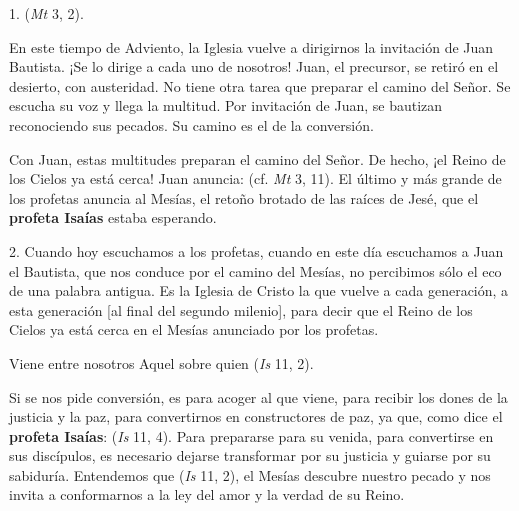 				
				\begin{body}
					1.  (\emph{Mt} 3, 2). 
					
					En este tiempo de Adviento, la Iglesia vuelve a dirigirnos la invitación de Juan Bautista. ¡Se lo dirige a cada uno de nosotros! Juan, el precursor, se retiró en el desierto, con austeridad. No tiene otra tarea que preparar el camino del Señor. Se escucha su voz y llega la multitud. Por invitación de Juan, se bautizan reconociendo sus pecados. Su camino es el de la conversión. 
					
					Con Juan, estas multitudes preparan el camino del Señor. De hecho, ¡el Reino de los Cielos ya está cerca! Juan anuncia:  (cf. \emph{Mt} 3, 11). El último y más grande de los profetas anuncia al Mesías, el retoño brotado de las raíces de Jesé, que el \textbf{profeta Isaías} estaba esperando. 
					
					2. Cuando hoy escuchamos a los profetas, cuando en este día escuchamos a Juan el Bautista, que nos conduce por el camino del Mesías, no percibimos sólo el eco de una palabra antigua. Es la Iglesia de Cristo la que vuelve a cada generación, a esta generación {[}al final del segundo milenio{]}, para decir que el Reino de los Cielos ya está cerca en el Mesías anunciado por los profetas. 
					
					Viene entre nosotros Aquel sobre quien  (\emph{Is} 11, 2). 
					
					Si se nos pide conversión, es para acoger al que viene, para recibir los dones de la justicia y la paz, para convertirnos en constructores de paz, ya que, como dice el \textbf{profeta Isaías}:  (\emph{Is} 11, 4). Para prepararse para su venida, para convertirse en sus discípulos, es necesario dejarse transformar por su justicia y guiarse por su sabiduría. Entendemos que  (\emph{Is} 11, 2), el Mesías descubre nuestro pecado y nos invita a conformarnos a la ley del amor y la verdad de su Reino. 
					

\end{body}
